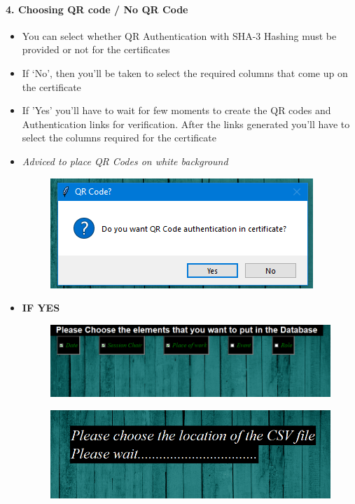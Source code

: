 \newpage
\paragraph{4. Choosing QR code / No QR Code}
\begin{itemize}
	\item You can select whether QR Authentication with SHA-3 Hashing must be provided or not for the certificates
	\item If `No', then you'll be taken to select the required columns that come up on the certificate
	\item If 'Yes' you'll have to wait for few moments to create the QR codes and Authentication links for verification. After the links generated you'll have to select the columns required for the certificate
	\item \textit{Adviced to place QR Codes on white background}


\begin{figure}[H]
	\centering
	\includegraphics[width=0.6\linewidth]{"images/generation_qr_nqr/Screenshot (39)"}
	\label{fig:screenshot-39}
\end{figure}

\item \large\textbf{IF YES}

\begin{figure}[H]
	\centering
	\includegraphics[width=0.7\linewidth]{"images/generation_qr_nqr/Screenshot (99)"}
	\label{fig:screenshot-99}
\end{figure}

\begin{figure}[H]
	\centering
	\includegraphics[width=0.7\linewidth]{"images/generation_qr_nqr/Screenshot (51)"}
	\label{fig:screenshot-51}
\end{figure}


\end{itemize}
